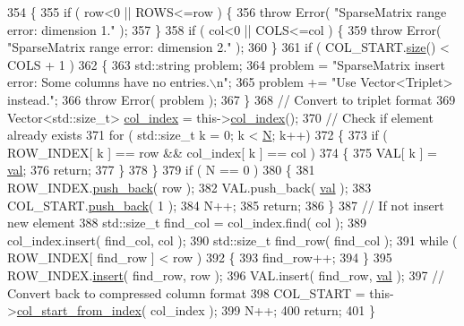 \begin{DoxyCode}
354   \{
355     \textcolor{keywordflow}{if} ( row<0 || ROWS<=row )   \{
356       \textcolor{keywordflow}{throw} Error( \textcolor{stringliteral}{"SparseMatrix range error: dimension 1."} );
357     \}
358     \textcolor{keywordflow}{if} ( col<0 || COLS<=col )   \{
359       \textcolor{keywordflow}{throw} Error( \textcolor{stringliteral}{"SparseMatrix range error: dimension 2."} );
360     \}
361     \textcolor{keywordflow}{if} ( COL\_START.\hyperlink{classLuna_1_1Vector_ac9b6ed7a0df401728f27c193fbc8f4d8}{size}() < COLS + 1 )
362     \{
363       std::string problem;
364       problem  = \textcolor{stringliteral}{"SparseMatrix insert error: Some columns have no entries.\(\backslash\)n"};
365       problem += \textcolor{stringliteral}{"Use Vector<Triplet> instead."};
366       \textcolor{keywordflow}{throw} Error( problem );
367     \}
368     \textcolor{comment}{// Convert to triplet format}
369     Vector<std::size\_t> \hyperlink{classLuna_1_1SparseMatrix_ae7f456c12b3075f21b15bb4ee114d8af}{col\_index} = this->\hyperlink{classLuna_1_1SparseMatrix_ae7f456c12b3075f21b15bb4ee114d8af}{col\_index}();
370     \textcolor{comment}{// Check if element already exists}
371     \textcolor{keywordflow}{for} ( std::size\_t k = 0; k < \hyperlink{namespaceHeat__plot_a7d050092798e28458a263710837bda77}{N}; k++)
372     \{
373       \textcolor{keywordflow}{if} ( ROW\_INDEX[ k ] == row && col\_index[ k ] == col )
374       \{
375         VAL[ k ] = \hyperlink{classLuna_1_1SparseMatrix_ac22d87e2fb618c6140c579bc72dd503b}{val};
376         \textcolor{keywordflow}{return};
377       \}
378     \}
379     \textcolor{keywordflow}{if} ( N == 0 )
380     \{
381       ROW\_INDEX.\hyperlink{classLuna_1_1Vector_abf2693db9286f81cf68693fc4fb9fd18}{push\_back}( row );
382       VAL.push\_back( \hyperlink{classLuna_1_1SparseMatrix_ac22d87e2fb618c6140c579bc72dd503b}{val} );
383       COL\_START.\hyperlink{classLuna_1_1Vector_abf2693db9286f81cf68693fc4fb9fd18}{push\_back}( 1 );
384       N++;
385       \textcolor{keywordflow}{return};
386     \}
387     \textcolor{comment}{// If not insert new element}
388     std::size\_t find\_col = col\_index.find( col );
389     col\_index.insert( find\_col, col );
390     std::size\_t find\_row( find\_col );
391     \textcolor{keywordflow}{while} ( ROW\_INDEX[ find\_row ] < row )
392     \{
393       find\_row++;
394     \}
395     ROW\_INDEX.\hyperlink{classLuna_1_1Vector_a5d6821d9dd958423379cafbc6658853f}{insert}( find\_row, row );
396     VAL.insert( find\_row, \hyperlink{classLuna_1_1SparseMatrix_ac22d87e2fb618c6140c579bc72dd503b}{val} );
397     \textcolor{comment}{// Convert back to compressed column format}
398     COL\_START = this->\hyperlink{classLuna_1_1SparseMatrix_aff245e8e7b0609dd7dc5c2a533c43c87}{col\_start\_from\_index}( col\_index );
399     N++;
400     \textcolor{keywordflow}{return};
401   \}
\end{DoxyCode}
\mbox{\label{classLuna_1_1SparseMatrix_a532c8a8b80b0accf950a642344e7954f}} 
